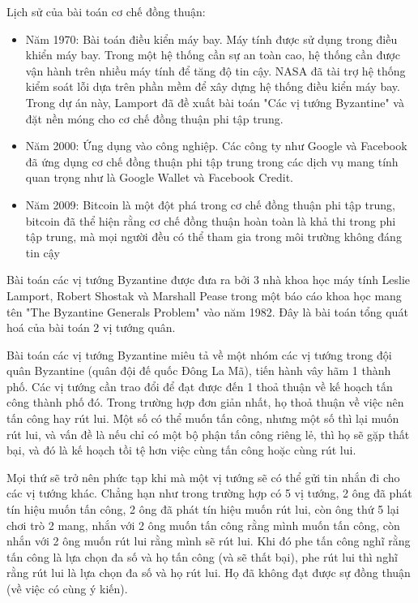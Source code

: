 \documentclass[14pt, a4paper]{article}
\numberwithin{equation}{section}
\numberwithin{figure}{section}
\numberwithin{dl}{section}
\numberwithin{md}{section}
\numberwithin{bd}{section}
\numberwithin{dn}{section}
\numberwithin{hq}{section}
\begin{document}
\begin{enumerate}
        Lịch sử của bài toán cơ chế đồng thuận:

        \begin{itemize}
            \item Năm 1970: Bài toán điều kiển máy bay. Máy tính được sử dụng trong điều khiển máy bay.
            Trong một hệ thống cần sự an toàn cao, hệ thống cần được vận hành trên nhiều máy tính để tăng độ tin cậy.
            NASA đã tài trợ hệ thống kiểm soát lỗi dựa trên phần mềm để xây dựng hệ thống điều kiển máy bay.
            Trong dự án này, Lamport đã đề xuất bài toán "Các vị tướng Byzantine" và đặt nền móng cho cơ chế đồng thuận phi tập trung.
            \item Năm 2000: Ứng dụng vào công nghiệp. Các công ty như Google và Facebook đã ứng dụng cơ chế đồng thuận phi tập trung trong các dịch vụ mang tính quan trọng như là Google Wallet và Facebook Credit.
            \item Năm 2009: Bitcoin là một đột phá trong cơ chế đồng thuận phi tập trung, bitcoin đã thể hiện rằng cơ chế đồng thuận hoàn toàn là khả thi trong phi tập trung, mà mọi người đều có thể tham gia trong môi trường không đáng tin cậy
        \end{itemize}

        Bài toán các vị tướng Byzantine được đưa ra bởi 3 nhà khoa học máy tính Leslie Lamport, Robert Shostak và Marshall Pease trong một báo cáo khoa học mang tên "The Byzantine Generals Problem" vào năm 1982. Đây là bài toán tổng quát hoá của bài toán 2 vị tướng quân.

        Bài toán các vị tướng Byzantine miêu tả về một nhóm các vị tướng trong đội quân Byzantine (quân đội đế quốc Đông La Mã), tiến hành vây hãm 1 thành phố. Các vị tướng cần trao đổi để đạt được đến 1 thoả thuận về kế hoạch tấn công thành phố đó. Trong trường hợp đơn giản nhất, họ thoả thuận về việc nên tấn công hay rút lui. Một số có thể muốn tấn công, nhưng một số thì lại muốn rút lui, và vấn đề là nếu chỉ có một bộ phận tấn công riêng lẻ, thì họ sẽ gặp thất bại, và đó là kế hoạch tồi tệ hơn việc cùng tấn công hoặc cùng rút lui.

        Mọi thứ sẽ trở nên phức tạp khi mà một vị tướng sẽ có thể gửi tin nhắn đi cho các vị tướng khác. Chẳng hạn như trong trường hợp có 5 vị tướng, 2 ông đã phát tín hiệu muốn tấn công, 2 ông đã phát tín hiệu muốn rút lui, còn ông thứ 5 lại chơi trò 2 mang, nhắn với 2 ông muốn tấn công rằng mình muốn tấn công, còn nhắn với 2 ông muốn rút lui rằng mình sẽ rút lui. Khi đó phe tấn công nghĩ rằng tấn công là lựa chọn đa số và họ tấn công (và sẽ thất bại), phe rút lui thì nghĩ rằng rút lui là lựa chọn đa số và họ rút lui. Họ đã không đạt được sự đồng thuận (về việc có cùng ý kiến).


\end{enumerate}
\end{document}
